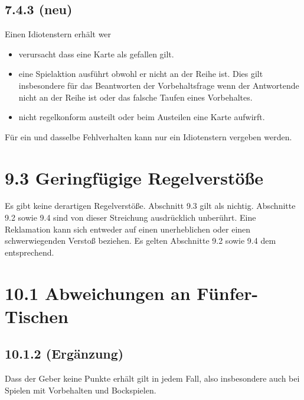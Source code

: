 \subsection*{7.4.3 (neu)}

Einen Idiotenstern erhält wer
\begin{itemize}
    \item{verursacht dass eine Karte als gefallen gilt.}
    \item{eine Spielaktion ausführt obwohl er nicht an der Reihe ist. Dies gilt
        insbesondere für das Beantworten der Vorbehaltsfrage wenn der
        Antwortende nicht an der Reihe ist oder das falsche Taufen eines
        Vorbehaltes.}
    \item{nicht regelkonform austeilt oder beim Austeilen eine Karte aufwirft.}
\end{itemize}

Für ein und dasselbe Fehlverhalten kann nur ein Idiotenstern vergeben werden.

\section*{9.3 Geringfügige Regelverstöße}

Es gibt keine derartigen Regelverstöße. Abschnitt 9.3 gilt als nichtig.
Abschnitte 9.2 sowie 9.4 sind von dieser Streichung ausdrücklich unberührt.
Eine Reklamation kann sich entweder auf einen unerheblichen oder einen
schwerwiegenden Verstoß beziehen. Es gelten Abschnitte 9.2 sowie 9.4 dem
entsprechend.

\section*{10.1 Abweichungen an Fünfer-Tischen}

\subsection*{10.1.2 (Ergänzung)}

Dass der Geber keine Punkte erhält gilt in jedem Fall, also insbesondere auch
bei Spielen mit Vorbehalten und Bockspielen.


